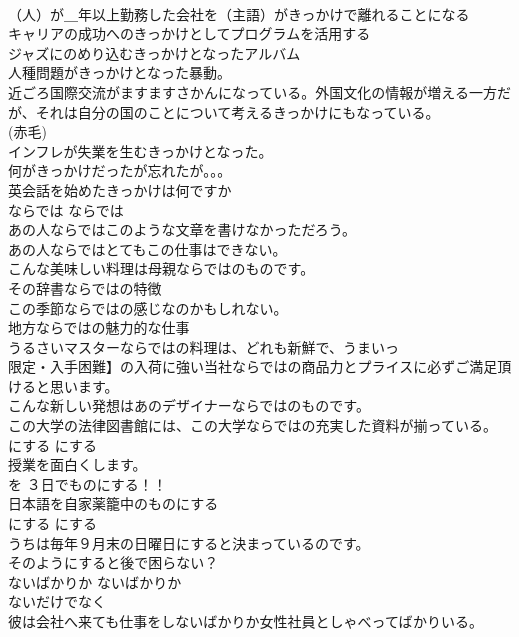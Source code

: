 \documentclass[8pt]{extreport}
\begin{document}
\begin{CJK}{UTF8}{min}
\\	（人）が＿年以上勤務した会社を（主語）がきっかけで離れることになる  
\\	キャリアの成功へのきっかけとしてプログラムを活用する   
\\	ジャズにのめり込むきっかけとなったアルバム   
\\	人種問題がきっかけとなった暴動。  
\\	近ごろ国際交流がますますさかんになっている。外国文化の情報が増える一方だが、それは自分の国のことについて考えるきっかけにもなっている。  
\\	(赤毛)
\\	インフレが失業を生むきっかけとなった。  
\\	何がきっかけだったが忘れたが。。。   
\\	英会話を始めたきっかけは何ですか   
\\	ならでは	ならでは	
\\	あの人ならではこのような文章を書けなかっただろう。  
\\	あの人ならではとてもこの仕事はできない。  
\\	こんな美味しい料理は母親ならではのものです。  
\\	その辞書ならではの特徴   
\\	この季節ならではの感じなのかもしれない。   
\\	地方ならではの魅力的な仕事   
\\	うるさいマスターならではの料理は、どれも新鮮で、うまいっ   
\\	限定・入手困難】の入荷に強い当社ならではの商品力とプライスに必ずご満足頂けると思います。   
\\	こんな新しい発想はあのデザイナーならではのものです。  
\\	この大学の法律図書館には、この大学ならではの充実した資料が揃っている。  
\\	にする	にする	
\\	授業を面白くします。  
\\	を ３日でものにする！！  
\\	日本語を自家薬籠中のものにする  
\\	にする	にする	
\\	うちは毎年９月末の日曜日にすると決まっているのです。  
\\	そのようにすると後で困らない？  
\\	ないばかりか	ないばかりか	
\\	ないだけでなく	
\\	彼は会社へ来ても仕事をしないばかりか女性社員としゃべってばかりいる。  

\end{CJK}
\end{document}
